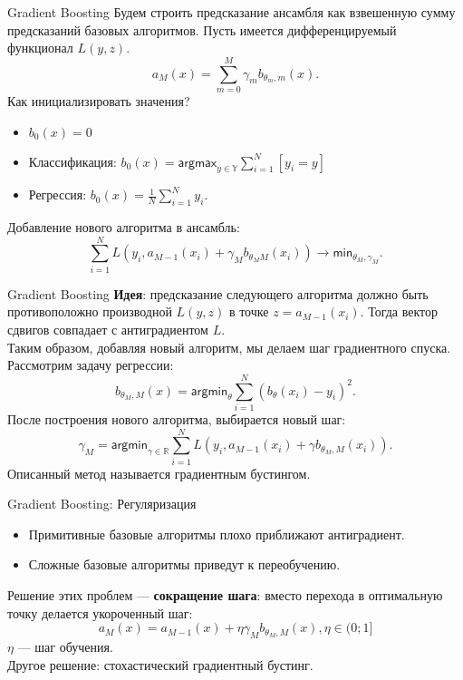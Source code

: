 \documentclass[handout]{beamer}
\begin{document}
\begin{frame}{Gradient Boosting}
	Будем строить предсказание ансамбля как взвешенную сумму предсказаний базовых алгоритмов. Пусть имеется дифференцируемый функционал $L(y, z)$.
	\begin{equation*}
		a_M(x)=\sum_{m=0}^M\gamma_mb_{\theta_m, m}(x).
	\end{equation*}
	Как инициализировать значения?
	\begin{itemize}
		\item $b_0(x)=0$
		\item Классификация: $b_0(x) = \mathsf{argmax}_{y\in\mathbb{Y}}\sum_{i=1}^N[y_i=y]$
		\item Регрессия: $b_0(x) = \frac{1}{N}\sum_{i=1}^Ny_i$.
	\end{itemize}
	Добавление нового алгоритма в ансамбль:
	\begin{equation*}
		\sum_{i=1}^NL(y_i, a_{M-1}(x_i)+\gamma_Mb_{\theta_MM}(x_i))\rightarrow \mathsf{min}_{\theta_M, \gamma_M}.
	\end{equation*}
\end{frame}

\begin{frame}{Gradient Boosting}
	\textbf{Идея}: предсказание следующего алгоритма должно быть противоположно производной $L(y, z)$ в точке $z=a_{M-1}(x_i)$. Тогда вектор сдвигов совпадает с антиградиентом $L$.\\
	Таким образом, добавляя новый алгоритм, мы делаем шаг градиентного спуска.\\
	Рассмотрим задачу регрессии:
	\begin{equation*}
		b_{\theta_M, M}(x) = \mathsf{argmin}_{\theta}\sum_{i=1}^N(b_{\theta}(x_i) - y_i)^2.
	\end{equation*}
	После построения нового алгоритма, выбирается новый шаг:
	\begin{equation*}
		\gamma_M=\mathsf{argmin}_{\gamma\in\mathbb{R}}\sum_{i=1}^NL(y_i, a_{M-1}(x_i)+\gamma b_{\theta_M, M}(x_i)).
	\end{equation*}
	Описанный метод называется градиентным бустингом.
\end{frame}

\begin{frame}{Gradient Boosting: Регуляризация}
	\begin{itemize}
		\item Примитивные базовые алгоритмы плохо приближают антиградиент.
		\item Сложные базовые алгоритмы приведут к переобучению.
	\end{itemize}
	Решение этих проблем --- \textbf{сокращение шага}: вместо перехода в оптимальную точку делается укороченный шаг:
	\begin{equation*}
		a_M(x)=a_{M-1}(x)+\eta\gamma_Mb_{\theta_M, M}(x), \eta \in (0;1]
	\end{equation*}
	$\eta$ --- шаг обучения.\\
	Другое решение: стохастический градиентный бустинг.
	
\end{frame}
\end{document}
